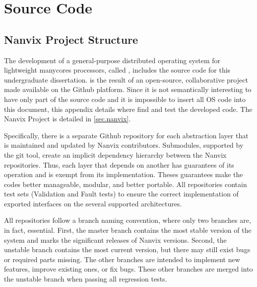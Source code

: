 \chapter{Source Code}
\label{ch:source-code}




\renewcommand{\thefigure}{B-\arabic{figure}}
\setcounter{figure}{0}

\section{Nanvix Project Structure}

    The development of a general-purpose distributed operating system for
    lightweight manycores processors, called \nanvixos, includes the source
    code for this undergraduate dissertation. \nanvixos is the result of an
    open-source, collaborative project made available on the Github platform.
    Since it is not semantically interesting to have only part of the source
    code and it is impossible to insert all OS code into this document, this
    appendix details where find and test the developed code. The Nanvix
    Project is detailed in \autoref{sec.nanvix}.

    Specifically, there is a separate Github repository for each abstraction
    layer that is maintained and updated by Nanvix contributors. Submodules,
    supported by the git tool, create an implicit dependency hierarchy
    between the Nanvix repositories. Thus, each layer that depends on another
    has guarantees of its operation and is exempt from its implementation.
    Theses guarantees make the codes better manageable, modular, and better
    portable. All repositories contain test sets (Validation and Fault tests)
    to ensure the correct implementation of exported interfaces on the several
    supported architectures.

    All repositories follow a branch naming convention, where only two
    branches are, in fact, essential. First, the master branch contains
    the most stable version of the system and marks the significant
    releases of Nanvix versions. Second, the unstable branch contains
    the most current version, but there may still exist bugs or required
    parts missing. The other branches are intended to implement new features,
    improve existing ones, or fix bugs. These other branches are merged
    into the unstable branch when passing all regression tests.

